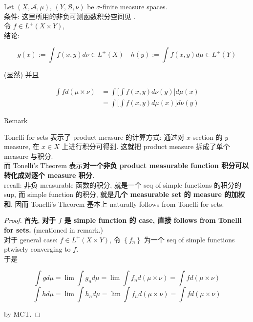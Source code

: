\begin{theorem}{}

Let \((X,\mathcal{A},\mu)\), \((Y,\mathcal{B},\nu)\) be \(\sigma\)-finite measure spaces.\\
条件: 这里所用的非负可测函数积分空间见 .\\
令 \(f \in L^{+}(X \times Y)\),\\
结论:

\[g(x) := \int f(x,y) d\nu \in L^{+}(X)\quad h(y) := \int f(x,y) d\mu \in L^{+}(Y)\]

(显然) 并且

\[\begin{matrix}
{\int f d(\mu \times \nu)} & {= \int\lbrack\int f(x,y) d\nu(y)\rbrack d\mu(x)} \\
 & {= \int\lbrack\int f(x,y) d\mu(x)\rbrack d\nu(y)}
\end{matrix}\]

\end{theorem}

\begin{qlremark}{Remark}

Tonelli for sets 表示了 product measure 的计算方式: 通过对 \(x\)-section 的 \(y\) measure, 在 \(x \in X\) 上进行积分可得到. 这就把 product measure 拆成了单个 measure 与积分.\\
而 Tonelli's Theorem 表示\textbf{对一个非负 product measurable function 积分可以转化成对逐个 measure 积分.}\\
recall: 非负 measurable 函数的积分, 就是一个 seq of simple functions 的积分的 sup, 而 simple function 的积分, 就是\textbf{几个 measurable set 的 measure 的加权和}. 因而 Tonelli's Theorem 基本上 naturally follows from Tonelli for sets.

\end{qlremark}

\begin{proof}

首先, \textbf{对于 \(f\) 是 simple function 的 case, 直接 follows from Tonelli for sets.} (mentioned in remark.)\\
对于 general case: \(f \in L^{+}(X \times Y)\), 令 \(\left\{ f_{n} \right\}\) 为一个 seq of simple functions ptwisely converging to \(f\).\\
于是

\[\int g d\mu = \lim\int g_{n} d\mu = \lim\int f_{n} d(\mu \times \nu) = \int f d(\mu \times \nu)\]\[\int h d\mu = \lim\int h_{n} d\mu = \lim\int f_{n} d(\mu \times \nu) = \int f d(\mu \times \nu)\]

by MCT.

\end{proof}

